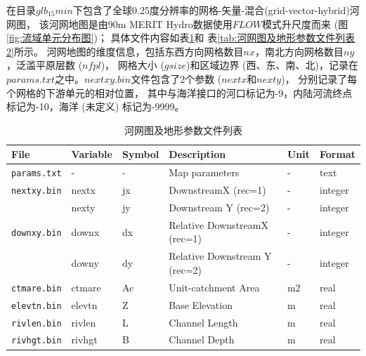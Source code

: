 在目录$glb_15min$下包含了全球0.25度分辨率的网格-矢量-混合(grid-vector-hybrid)河网图，
该河网地图是由90m MERIT Hydro数据使用$FLOW$模式升尺度而来 (图\ref{fig:流域单元分布图})；
具体文件内容如表\ref{tab:河网图及地形参数文件列表}和 表\ref{tab:河网图及地形参数文件列表2}所示。
河网地图的维度信息，包括东西方向网格数目$nx$，南北方向网格数目$ny$，泛滥平原层数 ($nfpl$)，
网格大小 ($gsize$)和区域边界 (西、东、南、北)，记录在$params.txt$之中。$nextxy.bin$文件包含了2个参数 ($nextx$和$nexty$)，
分别记录了每个网格的下游单元的相对位置，
其中与海洋接口的河口标记为-9，内陆河流终点标记为-10，海洋 (未定义) 标记为-9999。

\begin{table}[]
\centering
\caption{河网图及地形参数文件列表}
\label{tab:河网图及地形参数文件列表}
    \begin{tabular}[h]{p{2.5cm}p{1.5cm}p{2.5cm}p{4cm}p{2cm}p{1cm}}  %
    \toprule
    File              & Variable & Symbol                        & Description                                  & Unit    & Format  \\ \midrule
    \texttt{params.txt}        & -        & -                             & Map parameters                     & -         & text    \\
    \texttt{nextxy.bin}        & nextx    & jx                            & DownstreamX (rec=1)         & -         & integer \\
                                       & nexty    & jy                         & Downstream Y (rec=2)            & -        & integer \\
    \texttt{downxy.bin}      & downx   & dx                        & Relative DownstreamX (rec=1)   & -   & integer \\
                                       & downy   & dy                      & Relative Downstream Y (rec=2)   & -    & integer \\
    \texttt{ctmare.bin}       & ctmare   & Ac                     & Unit-catchment Area                     & m2   & real    \\
    \texttt{elevtn.bin}        & elevtn    & Z                        & Base Elevation                         & m       & real    \\
    \texttt{rivlen.bin}         & rivlen    & L                         & Channel Length                        & m       & real    \\
    \texttt{rivhgt.bin}         & rivhgt   & B                         & Channel Depth                          & m       & real    \\

\end{tabular}
\end{table}
